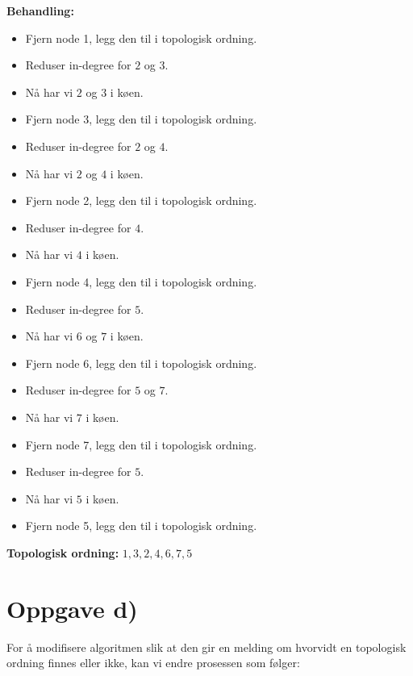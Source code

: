 \documentclass[12pt]{article}
\begin{document}
\textbf{Behandling:}
\begin{itemize}
    \item Fjern node 1, legg den til i topologisk ordning.
    \item Reduser in-degree for \(2\) og \(3\).
    \item Nå har vi \(2\) og \(3\) i køen.
    \item Fjern node 3, legg den til i topologisk ordning.
    \item Reduser in-degree for \(2\) og \(4\).
    \item Nå har vi \(2\) og \(4\) i køen.
    \item Fjern node 2, legg den til i topologisk ordning.
    \item Reduser in-degree for \(4\).
    \item Nå har vi \(4\) i køen.
    \item Fjern node 4, legg den til i topologisk ordning.
    \item Reduser in-degree for \(5\).
    \item Nå har vi \(6\) og \(7\) i køen.
    \item Fjern node 6, legg den til i topologisk ordning.
    \item Reduser in-degree for \(5\) og \(7\).
    \item Nå har vi \(7\) i køen.
    \item Fjern node 7, legg den til i topologisk ordning.
    \item Reduser in-degree for \(5\).
    \item Nå har vi \(5\) i køen.
    \item Fjern node 5, legg den til i topologisk ordning.
\end{itemize}

\noindent
\textbf{Topologisk ordning:} \(1, 3, 2, 4, 6, 7, 5\)

\section*{Oppgave d)}

For å modifisere algoritmen slik at den gir en melding om hvorvidt en topologisk ordning finnes eller ikke, kan vi endre prosessen som følger:
\end{document}
